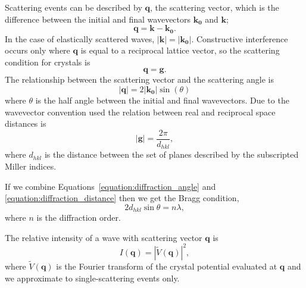 Scattering events can be described by $\mathbf{q}$, the scattering vector, which is the difference between the initial and final wavevectors $\mathbf{k_0}$ and $\mathbf{k}$;
\begin{equation}
\mathbf{q} = \mathbf{k} - \mathbf{k_0}.
\end{equation}
In the case of elastically scattered waves, $|\mathbf{k}| = |\mathbf{k_0}|$.
Constructive interference occurs only where $\mathbf{q}$ is equal to a reciprocal lattice vector, so the scattering condition for crystals is
\begin{equation}
\mathbf{q} = \mathbf{g}.
\end{equation}
The relationship between the scattering vector and the scattering angle is
\begin{equation}\label{equation:diffraction_angle}
\left|\mathbf{q}\right| = 2\left|\mathbf{k_0}\right|\sin(\theta)
\end{equation}
where $\theta$ is the half angle between the initial and final wavevectors.
Due to the wavevector convention used the relation between real and reciprocal space distances is
\begin{equation}\label{equation:diffraction_distance}
\left|\mathbf{g}\right| = \frac{2\pi}{d_{hkl}},
\end{equation}
where $d_{hkl}$ is the distance between the set of planes described by the subscripted Miller indices.

If we combine Equations~\ref{equation:diffraction_angle} and \ref{equation:diffraction_distance} then we get the Bragg condition,
\begin{equation}
2d_{hkl}\sin\theta = n\lambda,
\end{equation}
where $n$ is the diffraction order.

The relative intensity of a wave with scattering vector $\mathbf{q}$ is
\begin{equation}
I(\mathbf{q}) = \left|\tilde{V}(\mathbf{q})\right|^2,
\end{equation}
where $\tilde{V}(\mathbf{q})$ is the Fourier transform of the crystal potential evaluated at $\mathbf{q}$ and we approximate to single-scattering events only.

